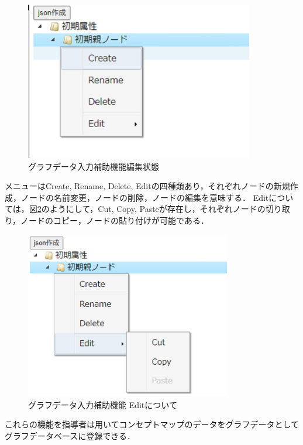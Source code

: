 \begin{figure}[htbp]
\begin{center}
\includegraphics[width=10cm]{img/hojo_change_name.eps}
\end{center}
\caption{グラフデータ入力補助機能編集状態}
\label{fig:hojo_change_name}
\end{figure}

\newpage
メニューはCreate, Rename, Delete, Editの四種類あり，それぞれノードの新規作成，ノードの名前変更，ノードの削除，ノードの編集を意味する．
Editについては，図\ref{fig:hojo_edit}のようにして，Cut, Copy, Pasteが存在し，それぞれノードの切り取り，ノードのコピー，ノードの貼り付けが可能である．

\begin{figure}[htbp]
\begin{center}
\includegraphics[width=9cm]{img/hojo_edit.eps}
\end{center}
\caption{グラフデータ入力補助機能 Editについて}
\label{fig:hojo_edit}
\end{figure}

これらの機能を指導者は用いてコンセプトマップのデータをグラフデータとしてグラフデータベースに登録できる．
\newpage

